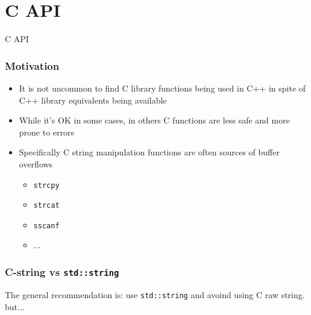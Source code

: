 \documentclass{beamer}
\begin{document}
\section{C API}
\begin{frame}
    \begin{center}
        C API
    \end{center}
\end{frame}
\begin{frame}
\frametitle{Motivation}
    \begin{itemize}
        \item It is not uncommon to find C library functions being used in C++ in spite of 
              C++ library equivalents being available
        \pause
        \item While it's OK in some cases, in others C functions are less safe and more prone to errors
        \pause
        \item Specifically C string manipulation functions are often sources of buffer overflows 
            \begin{itemize}
                \item \texttt{strcpy}
                \item \texttt{strcat}
                \item \texttt{sscanf}
                \item ...
            \end{itemize}
    \end{itemize}
\end{frame}

\begin{frame}
\frametitle{C-string vs \texttt{std::string}}
    \pause
    The general recommendation is: use \texttt{std::string} and avoind using C raw string.
    \pause \newline \newline
    but...
\end{frame}
\end{document}
